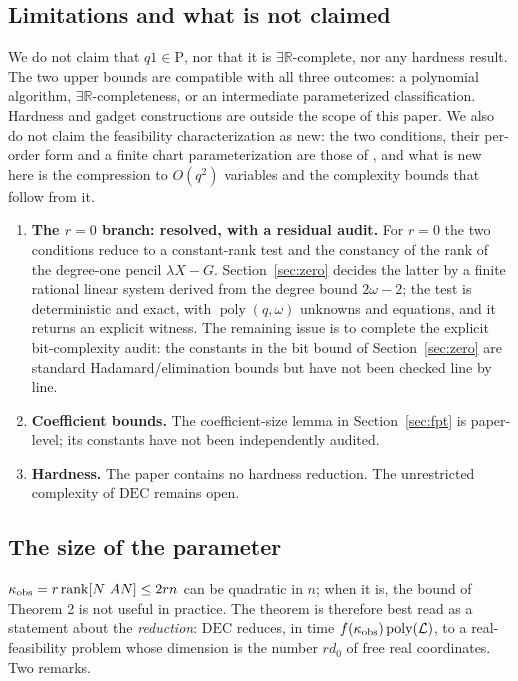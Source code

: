 \documentclass[journal]{IEEEtran}
\theoremstyle{plainn}
\theoremstyle{remark}
\begin{document}
\subsection{Limitations and what is not claimed}\label{sec:limits}
We do not claim that $q1\in\mathrm P$, nor that it is $\exists\mathbb R$-complete, nor any hardness result. The two upper bounds are compatible with all three outcomes: a polynomial algorithm, $\exists\mathbb R$-completeness, or an intermediate parameterized classification. Hardness and gadget constructions are outside the scope of this paper. We also do not claim the feasibility characterization as new: the two conditions, their per-order form and a finite chart parameterization are those of \cite{fer10,dar25,fer26a,fer26b}, and what is new here is the compression to $O(q^2)$ variables and the complexity bounds that follow from it.
\begin{enumerate}
\item \textbf{The $r=0$ branch: resolved, with a residual audit.} For $r=0$ the two conditions reduce to a constant-rank test and the constancy of the rank of the degree-one pencil $\lambda X-G$. Section~\ref{sec:zero} decides the latter by a finite rational linear system derived from the degree bound $2\omega-2$; the test is deterministic and exact, with $\operatorname{poly}(q,\omega)$ unknowns and equations, and it returns an explicit witness. The remaining issue is to complete the explicit bit-complexity audit: the constants in the bit bound of Section~\ref{sec:zero} are standard Hadamard/elimination bounds but have not been checked line by line.
\item \textbf{Coefficient bounds.} The coefficient-size lemma in Section~\ref{sec:fpt} is paper-level; its constants have not been independently audited.
\item \textbf{Hardness.} The paper contains no hardness reduction. The unrestricted complexity of $\mathrm{DEC}$ remains open.
\end{enumerate}
\subsection{The size of the parameter}\label{sec:paramsize}
$\kappa_{\rm obs}=r\operatorname{rank}[N\ AN]\le 2rn$ can be quadratic in $n$; when it is, the bound of Theorem 2 is not useful in practice. The theorem is therefore best read as a statement about the \emph{reduction}: $\mathrm{DEC}$ reduces, in time $f(\kappa_{\rm obs})\operatorname{poly}(\mathcal L)$, to a real-feasibility problem whose dimension is the number $rd_0$ of free real coordinates. Two remarks.
\end{document}
